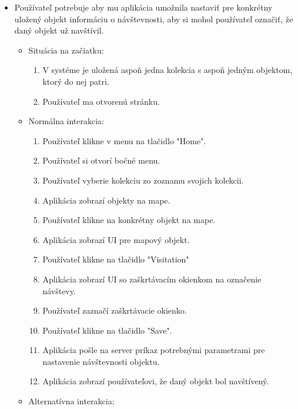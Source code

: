 \begin{itemize}
      \item Používateľ potrebuje aby mu aplikácia umožnila nastaviť pre konkrétny uložený objekt informáciu o návštevnosti, aby si mohol používateľ označiť, že daný objekt už navštívil.
            \begin{itemize}
                  \item Situácia na začiatku:
                        \begin{enumerate}
                              \item V systéme je uložená aspoň jedna kolekcia s aspoň jedným objektom, ktorý do nej patri.
                              \item Používateľ ma otvorenú stránku.
                        \end{enumerate}
                  \item Normálna interakcia:
                        \begin{enumerate}
                              \item Používateľ klikne v menu na tlačidlo "Home".
                              \item Používateľ si otvorí bočné menu.
                              \item Používateľ vyberie kolekciu zo zoznamu svojich kolekcii.
                              \item Aplikácia zobrazí objekty na mape.
                              \item Používateľ klikne na konkrétny objekt na mape.
                              \item Aplikácia zobrazí UI pre mapový objekt.
                              \item Používateľ klikne na tlačidlo "Visitation"
                              \item Aplikácia zobrazí UI so zaškrtávacím okienkom na označenie návštevy.
                              \item Používateľ zaznačí zaškrtávacie okienko.
                              \item Používateľ klikne na tlačidlo "Save".
                              \item Aplikácia pošle na server príkaz potrebnými parametrami pre nastavenie návštevnosti objektu.
                              \item Aplikácia zobrazí používateľovi, že daný objekt bol navštívený.
                        \end{enumerate}
                  \item Alternatívna interakcia:

\end{itemize}
\end{itemize}

